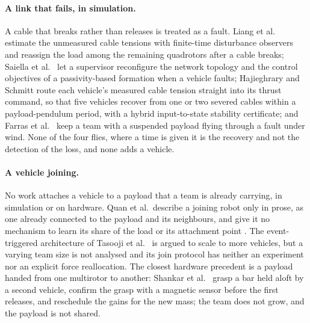 \paragraph{A link that fails, in simulation.} A cable that breaks rather than releases is treated as a fault.
Liang et al.\ \cite{liang2021fault} estimate the unmeasured cable tensions with finite-time disturbance
observers and reassign the load among the remaining quadrotors after a cable breaks; Saiella et al.\
\cite{saiella2021fault} let a supervisor reconfigure the network topology and the control objectives of a
passivity-based formation when a vehicle faults; Hajieghrary and Schmitt \cite{hajieghrary2026passive} route
each vehicle's measured cable tension straight into its thrust command, so that five vehicles recover from one or
two severed cables within a payload-pendulum period, with a hybrid input-to-state stability certificate; and
Farras et al.\ \cite{farrasFaultTolerantControlMultiQuadcopter2024} keep a team with a suspended payload flying
through a fault under wind. None of the four flies, where a time is given it is the recovery and not the
detection of the loss, and none adds a vehicle.

\paragraph{A vehicle joining.} No work attaches a vehicle to a payload that a team is already carrying, in
simulation or on hardware. Quan et al.\ describe a joining robot only in prose, as one already connected to the
payload and its neighbours, and give it no mechanism to learn its share of the load or its attachment point
\cite{quan2025swarm}. The event-triggered architecture of Tasooji et al.\
\cite{tasoojiCooperativeControlMultiQuadrotors} is argued to scale to more vehicles, but a varying team size is
not analysed and its join protocol has neither an experiment nor an explicit force reallocation. The closest
hardware precedent is a payload handed from one multirotor to another: Shankar et al.\ \cite{shankar2020inflight}
grasp a bar held aloft by a second vehicle, confirm the grasp with a magnetic sensor before the first releases,
and reschedule the gains for the new mass; the team does not grow, and the payload is not shared.

